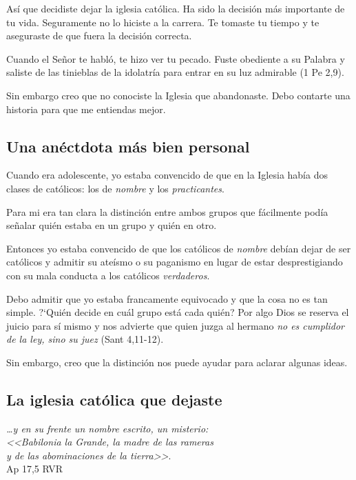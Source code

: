 \documentclass{article}
\begin{document}
As\'{i} que decidiste dejar la iglesia cat\'olica. Ha sido la decisi\'on m\'as importante de tu vida. Seguramente no lo hiciste a la carrera. Te tomaste tu tiempo y te aseguraste de que fuera la decisi\'on correcta. 

Cuando el Se\~nor te habl\'o, te hizo ver tu pecado. Fuste obediente a su Palabra y saliste de las tinieblas de la idolatr\'{i}a para entrar en su luz admirable (1 Pe 2,9).

Sin embargo creo que no conociste la Iglesia que abandonaste. Debo contarte una historia para que me entiendas mejor.

\subsection{Una an\'ectdota m\'as bien personal}

Cuando era adolescente, yo estaba convencido de que en la Iglesia hab\'{i}a dos clases de cat\'olicos: los de \emph{nombre} y los \emph{practicantes}.

Para mi era tan clara la distinci\'on entre ambos grupos que f\'acilmente pod\'{i}a se\~nalar qui\'en estaba en un grupo y qui\'en en otro.

Entonces yo estaba convencido de que los cat\'olicos de \emph{nombre} deb\'{i}an dejar de ser cat\'olicos y admitir su ate\'{i}smo o su paganismo en lugar de estar desprestigiando con su mala conducta a los cat\'olicos \emph{verdaderos}.

Debo admitir que yo estaba francamente equivocado y que la cosa no es tan simple. ?`Qui\'en decide en cu\'al grupo est\'a cada qui\'en? Por algo Dios se reserva el juicio para s\'{i} mismo y nos advierte que quien juzga al hermano \emph{no es cumplidor de la ley, sino su juez} (Sant 4,11-12).

Sin embargo, creo que la distinci\'on nos puede ayudar para aclarar algunas ideas.

\subsection{La iglesia cat\'olica que dejaste}

\begin{flushright}
\emph{{\ldots}y en su frente un nombre escrito, un misterio:\\
<<Babilonia la Grande, la madre de las rameras\\
y de las abominaciones de la tierra>>}.\\
Ap 17,5 RVR
\end{flushright}
\end{document}
